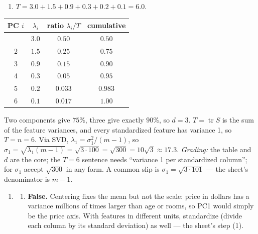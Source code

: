 \documentclass[
  11pt,
]{article}
\newcounter{none} %
\providecommand{\tightlist}{%
  \setlength{\itemsep}{0pt}\setlength{\parskip}{0pt}}
\newcommand{\answerspace}[1]{\par\vspace*{#1}}  %
\begin{document}
\answerspace{2.6in}

\begin{solutionbox}

\begin{enumerate}
\def\labelenumi{(\alph{enumi})}
\tightlist
\item
  \(T = 3.0+1.5+0.9+0.3+0.2+0.1 = 6.0\).
\end{enumerate}

{\def\LTcaptype{none} %
\begin{longtable}[]{@{}cccc@{}}
\toprule\noalign{}
PC \(i\) & \(\lambda_i\) & ratio \(\lambda_i/T\) & cumulative \\
\midrule\noalign{}
\endhead
\bottomrule\noalign{}
\endlastfoot
1 & \(3.0\) & \(0.50\) & \(0.50\) \\
2 & \(1.5\) & \(0.25\) & \(0.75\) \\
3 & \(0.9\) & \(0.15\) & \(0.90\) \\
4 & \(0.3\) & \(0.05\) & \(0.95\) \\
5 & \(0.2\) & \(0.033\) & \(0.983\) \\
6 & \(0.1\) & \(0.017\) & \(1.00\) \\
\end{longtable}
}

Two components give \(75\%\), three give exactly \(90\%\), so \(d = 3\).
\(T = \operatorname{tr}S\) is the sum of the feature variances, and
every standardized feature has variance 1, so \(T = n = 6\). Via SVD,
\(\lambda_1 = \sigma_1^2/(m-1)\), so
\(\sigma_1 = \sqrt{\lambda_1(m-1)} = \sqrt{3\cdot100} = \sqrt{300} = 10\sqrt3\approx17.3\).
\emph{Grading:} the table and \(d\) are the core; the \(T=6\) sentence
needs ``variance 1 per standardized column''; for \(\sigma_1\) accept
\(\sqrt{300}\) in any form. A common slip is
\(\sigma_1 = \sqrt{3\cdot101}\) --- the sheet's denominator is \(m-1\).

\begin{enumerate}
\def\labelenumi{(\alph{enumi})}
\setcounter{enumi}{1}
\tightlist
\item
  \begin{enumerate}
  \def\labelenumii{(\roman{enumii})}
  \tightlist
  \item
    \textbf{False.} Centering fixes the mean but not the scale: price in
    dollars has a variance millions of times larger than age or rooms,
    so PC1 would simply be the price axis. With features in different
    units, standardize (divide each column by its standard deviation) as
    well --- the sheet's step (1).
  \end{enumerate}
\end{enumerate}


\end{solutionbox}
\end{document}
